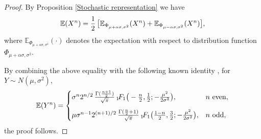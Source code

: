 \documentclass[12pt]{article}
\theoremstyle{definition}
\begin{document}
\begin{proof}
	
By Proposition \ref{Stochastic representation} we have
\begin{align*}
\mathbb{E}(X^{n})
=
{1\over 2}\, \big[\mathbb{E}_{\Phi_{\mu+\alpha\sigma, \sigma^2 }}(X^n)+\mathbb{E}_{\Phi_{\mu-\alpha\sigma, \sigma^2 }}(X^n)\big],
\end{align*}
where $\mathbb{E}_{\Phi_{\mu+\alpha\sigma, \sigma^2 }}(\cdot)$ denotes the expectation with respect to distribution function $\Phi_{\mu+\alpha\sigma, \sigma^2 }$.

By combining the above equality with the following known identity \citep{Win:14}, for $Y\sim N(\mu,\sigma^2)$,
\begin{align*}
\mathbb{E}(Y^n) =
\begin{cases}
\sigma^n 2^{n/2}\, 
{\Gamma({n+1\over 2})\over\sqrt{\pi}}\,
_1\!F_1\big(-{n\over 2},{1\over 2};-{\mu^2\over 2\sigma^2}\big), &  n \ \text{even},
\\[0,35cm]
\mu\sigma^{n-1} 2^{(n+1)/2}\,  
{\Gamma({n\over 2}+1)\over\sqrt{\pi}}\,
_1\!F_1\big({1-n\over 2},{3\over 2};-{\mu^2\over 2\sigma^2}\big), &  n \ \text{odd},
\end{cases}
\end{align*}
the proof follows.
\end{proof}
\end{document}
